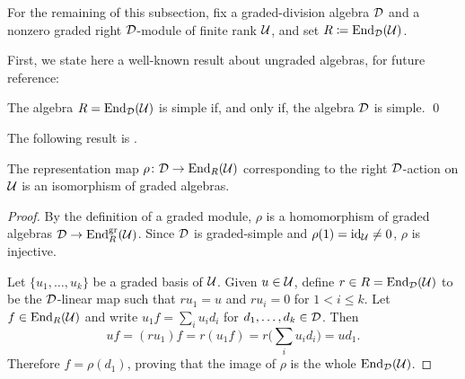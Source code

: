 For the remaining of this subsection, fix a graded-division algebra $\mathcal{D}$ and a nonzero graded right $\mathcal{D}$-module of finite rank $\mathcal U$, and set $R \coloneqq \operatorname{End}_{\mathcal{D}} (\mathcal U)$. 

First, we state here a well-known result about ungraded algebras, for future reference:

\begin{prop}\label{prop:R-simple-iff-D-simple}
	The algebra $R = \operatorname{End}_{\mathcal{D}} (\mathcal U)$ is simple if, and only if, the algebra $\mathcal{D}$ is simple. \qed
\end{prop}


The following result is \cite[Exercise 3 on page 60]{livromicha}.


\begin{lemma}\label{lemma:converse-density-thm}
    The representation map $\rho\colon \mathcal{D} \to \operatorname{End}_R (\mathcal U)$ corresponding to the right $\mathcal{D}$-action on $\mathcal U$
    is an isomorphism of graded algebras.
\end{lemma}

\begin{proof}
    By the definition of a graded module, $\rho$ is a homomorphism of graded algebras $\mathcal{D} \to \operatorname{End}_{R}^{\mathrm{gr}} (\mathcal U)$. 
    Since $\mathcal{D}$ is graded-simple and $\rho(1) = \operatorname{id}_{\mathcal U} \neq 0$, $\rho$ is injective.

    Let $\{u_1, \ldots, u_k \}$ be a graded basis of $\mathcal U$. 
    Given $u\in \mathcal U$, define $r\in R = \operatorname{End}_{\mathcal{D}} (\mathcal U)$ to be the $\mathcal{D}$-linear map such that $r u_1 = u$ and $r u_i = 0$ for $1< i \leq k$. 
    Let $f\in \operatorname{End}_R (\mathcal U)$ and write $u_1 f = \sum_i u_i d_i$ for $d_1, \ldots, d_k\in \mathcal{D}$. 
    Then
    \[
        u f = (r u_1) f = r (u_1 f) = r\big( \sum_i u_i d_i \big) = u d_1.
    \]
    Therefore $f = \rho(d_1)$, proving that the image of $\rho$ is the whole $\operatorname{End}_{\mathcal{D}} (\mathcal U)$.
\end{proof}
 
